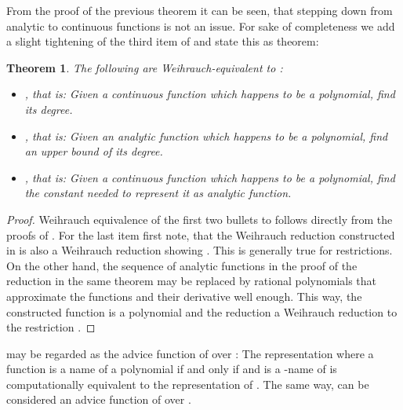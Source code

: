 \documentclass{eptcs-modified}
\newtheorem{theorem}{Theorem}
\begin{document}
			From the proof of the previous theorem it can be seen, that stepping down from analytic to continuous functions is not an issue.
			For sake of completeness we add a slight tightening of the third item of  and state this as theorem:

			\begin{theorem}\label{resu:polynomials as continuous functions}
				The following are Weihrauch-equivalent to :
				\begin{itemize}
					\item , that is: Given a continuous function which happens to be a polynomial, find its degree.
					\item , that is: Given an analytic function which happens to be a polynomial, find an upper bound of its degree.
					\item , that is: Given a continuous function which happens to be a polynomial, find the constant needed to represent it as analytic function.
				\end{itemize}
			\end{theorem}
			\begin{proof}
				Weihrauch equivalence of the first two bullets to  follows directly from the proofs of .
				For the last item first note, that the Weihrauch reduction  constructed in  is also a Weihrauch reduction showing .
				This is generally true for restrictions.
				On the other hand, the sequence  of analytic functions in the proof of the reduction  in the same theorem may be replaced by rational polynomials that approximate the functions and their derivative well enough.
				This way, the constructed function  is a polynomial and the reduction a Weihrauch reduction to the restriction .
			\end{proof}

			 may be regarded as the advice function of  over : The representation where a function  is a name of a polynomial  if and only if  and  is a -name of  is computationally equivalent to the representation of .
			The same way,  can be considered an advice function of  over .
\end{document}
